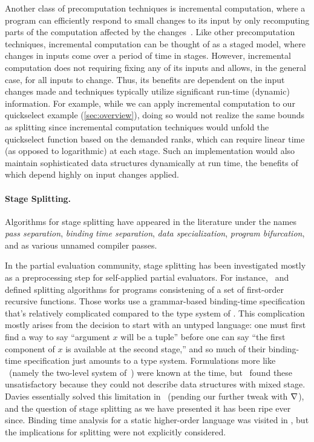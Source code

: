 Another class of precomputation techniques is incremental
computation, where a program can efficiently respond to small changes
to its input by only recomputing parts of the computation affected
by the
changes~\cite{DemersReTe81,PughTe89,RamalingamRe93,AcarBlBlHaTa09}.
Like other precomputation techniques, incremental computation can be
thought of as a staged model, where changes in inputs come over a
period of time in stages.
%
However, incremental computation does not requiring fixing any of its
inputs and allows, in the general case, for all inputs to
change. Thus, its benefits are dependent on the input changes made and
techniques typically utilize significant run-time (dynamic)
information.  For example, while we can apply incremental computation
to our quickselect example (\ref{sec:overview}), doing so would not
realize the same bounds as splitting since incremental computation
techniques would unfold the quickselect function based on the demanded
ranks, which can require linear time (as opposed to logarithmic) at
each stage.  Such an implementation would also maintain sophisticated
data structures dynamically at run time, the benefits of which depend
highly on input changes applied.

\paragraph{Stage Splitting.}

Algorithms for stage splitting have appeared in the literature under the names 
{\em pass separation}, {\em binding time separation}, {\em data specialization}, 
{\em program bifurcation}, and as various unnamed compiler passes.

In the partial evaluation community, stage splitting has been investigated 
mostly as a preprocessing step for self-applied partial evaluators. 
For instance,~\cite{Mogensen89a} and~\cite{DeNiel91} defined splitting algorithms
for programs consistening of a set of first-order recursive functions.
Those works use a grammar-based binding-time specification that's 
relatively complicated compared to the type system of \lang.
This complication mostly arises from the decision to start with an untyped language:
one must first find a way to say ``argument $x$ will be a tuple'' before one can say
``the first component of $x$ is available at the second stage,'' 
and so much of their binding-time specification just amounts to a type system.
Formulations more like \lang\ (namely the two-level system of~\cite{NN92-twolevel}) were known at the time,
but~\cite{Mogensen89a} found these unsatisfactory because they could not describe data structures with mixed stage.
Davies essentially solved this limitation in~\cite{davies96} (pending our further tweak with $\nabla$),
and the question of stage splitting as we have presented it has been ripe ever since.
Binding time analysis for a static higher-order language was visited in \cite{Mogensen89b},
but the implications for splitting were not explicitly considered.

